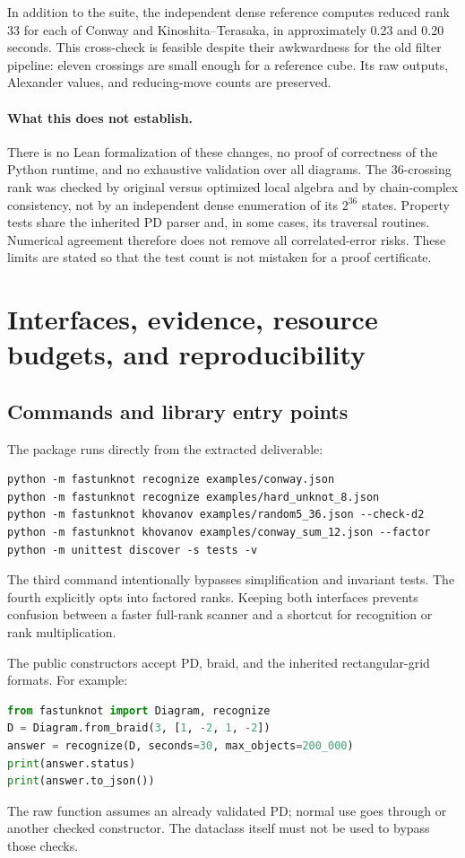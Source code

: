 \documentclass[11pt]{article}
\theoremstyle{definition}\newtheorem{definition}[theorem]{Definition}
\theoremstyle{remark}\newtheorem{remark}[theorem]{Remark}
\newcommand{\code}[1]{\texttt{\detokenize{#1}}}
\begin{document}
In addition to the suite, the independent dense reference computes reduced
rank 33 for each of Conway and Kinoshita--Terasaka, in approximately 0.23 and
0.20 seconds. This cross-check is feasible despite their awkwardness for the
old filter pipeline: eleven crossings are small enough for a reference cube.
Its raw outputs, Alexander values, and reducing-move counts are preserved.

\paragraph{What this does not establish.}
There is no Lean formalization of these changes, no proof of correctness of
the Python runtime, and no exhaustive validation over all diagrams. The
36-crossing rank was checked by original versus optimized local algebra and
by chain-complex consistency, not by an independent dense enumeration of
its $2^{36}$ states. Property tests share the inherited PD parser and, in some
cases, its traversal routines. Numerical agreement therefore does not remove
all correlated-error risks. These limits are stated so that the test count
is not mistaken for a proof certificate.

\section{Interfaces, evidence, resource budgets, and reproducibility}
\label{sec:usage}

\subsection{Commands and library entry points}

The package runs directly from the extracted deliverable:
\begin{lstlisting}
python -m fastunknot recognize examples/conway.json
python -m fastunknot recognize examples/hard_unknot_8.json
python -m fastunknot khovanov examples/random5_36.json --check-d2
python -m fastunknot khovanov examples/conway_sum_12.json --factor
python -m unittest discover -s tests -v
\end{lstlisting}
The third command intentionally bypasses simplification and invariant tests.
The fourth explicitly opts into factored ranks. Keeping both interfaces
prevents confusion between a faster full-rank scanner and a shortcut for
recognition or rank multiplication.

The public constructors accept PD, braid, and the inherited rectangular-grid
formats. For example:
\begin{lstlisting}[language=Python]
from fastunknot import Diagram, recognize
D = Diagram.from_braid(3, [1, -2, 1, -2])
answer = recognize(D, seconds=30, max_objects=200_000)
print(answer.status)
print(answer.to_json())
\end{lstlisting}
The raw \code{khovanov_rank(pd)} function assumes an already validated PD;
normal use goes through \code{Diagram.from_pd} or another checked constructor.
The dataclass itself must not be used to bypass those checks.
\end{document}
